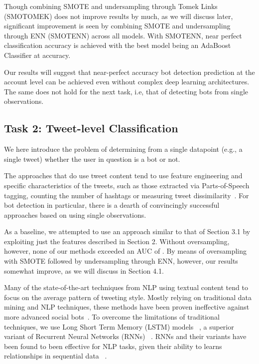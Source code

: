 Though combining SMOTE and undersampling through Tomek Links (SMOTOMEK) does not improve results by much, as we will discuss later, significant improvement is seen by combining SMOTE and undersampling through ENN (SMOTENN) across all models. With SMOTENN, near perfect classification accuracy is achieved with the best model being an AdaBoost Classifier at  accuracy. \par 

Our results will suggest that near-perfect accuracy bot detection prediction at the account level can be achieved even without complex deep learning architectures. The same does not hold for the next task, i.e,  that of detecting bots from single observations.

\subsection{Task 2: Tweet-level Classification}
We here introduce the problem of determining from a single datapoint (e.g., a single tweet) whether the user in question is a bot or not. 

The approaches that do use tweet content tend to use feature engineering and specific characteristics of the tweets, such as those extracted via Parts-of-Speech tagging, counting the number of hashtags or measuring tweet dissimilarity~\cite{ferrara2016rise}. For bot detection in particular, there is a dearth of convincingly successful approaches based on using single observations. \par 

As a baseline, we attempted to use an approach similar to that of Section 3.1 by exploiting just the features described in Section 2. Without oversampling, however, none of our methods exceeded an AUC of . By means of oversampling with SMOTE followed by undersampling through ENN, however, our results somewhat improve, as we will discuss in Section 4.1. \par 

Many of the state-of-the-art techniques from NLP using textual content tend to focus on the average pattern of tweeting style. Mostly relying on traditional data mining and NLP techniques, these methods have been proven ineffective against more advanced social bots~\cite{cresci2017paradigm}. To overcome the limitations of traditional techniques, we use Long Short Term Memory (LSTM) models ~\cite{hochreiter1997long}, a superior variant of Recurrent Neural Networks (RNNs) ~\cite{jozefowicz2015empirical}. RNNs and their variants have been found to been effective for NLP tasks, given their ability to learns relationships in sequential data ~\cite{goldberg2016primer}. \par 






